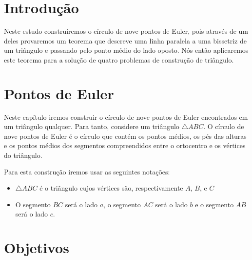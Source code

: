 \documentclass[12pt, openright, a4paper, brazil, openany, oneside]{abntex2}
\begin{document}


\frenchspacing 


\imprimircapa

\imprimirfolhaderosto*

\ABNTEXchapterfont

\tableofcontents*
\cleardoublepage
\textual

\chapter*[Introdução]{Introdução}


Neste estudo construiremos o círculo de nove pontos de Euler, pois através de um deles provaremos um teorema que descreve uma linha paralela a uma bissetriz de um triângulo e passando pelo ponto médio do lado oposto. Nós então aplicaremos este teorema para a solução de quatro problemas de construção de triângulo.



\chapter{Pontos de Euler}

Neste capítulo iremos construir o círculo de nove pontos de Euler encontrados em um triângulo qualquer. Para tanto, considere um triângulo $\triangle ABC$. O círculo de nove pontos de Euler é o círculo que contém os pontos médios, os pés das alturas e os pontos médios dos segmentos compreendidos entre o ortocentro e os vértices do triângulo.

Para esta construção iremos usar as seguintes notações:

\begin{itemize}
\item $\triangle ABC$ é o triângulo cujos vértices são, respectivamente $A$, $B$, e $C$
\item O segmento $BC$ será o lado $a$, o segmento $AC$ será o lado $b$ e o segmento $AB$ será o lado $c$.



\end{itemize} 



\chapter{Objetivos}
\end{document}
